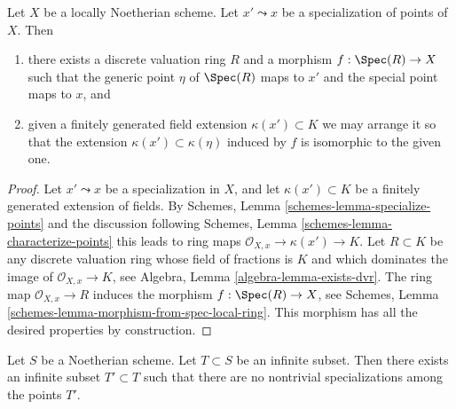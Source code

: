 \begin{lemma}
\label{lemma-locally-Noetherian-specialization-dvr}
Let $X$ be a locally Noetherian scheme.
Let $x' \leadsto x$ be a specialization of points of $X$.
Then
\begin{enumerate}
\item there exists a discrete valuation ring $R$ and a morphism
$f : \Spec(R) \to X$ such that the generic point $\eta$ of
$\Spec(R)$ maps to $x'$ and the special point maps to $x$, and
\item given a finitely generated field extension $\kappa(x') \subset K$
we may arrange it so that the extension $\kappa(x') \subset \kappa(\eta)$
induced by $f$ is isomorphic to the given one.
\end{enumerate}
\end{lemma}

\begin{proof}
Let $x' \leadsto x$ be a specialization in $X$, and let
$\kappa(x') \subset K$ be a finitely generated extension of fields. By
Schemes, Lemma \ref{schemes-lemma-specialize-points}
and the discussion following
Schemes, Lemma \ref{schemes-lemma-characterize-points}
this leads to ring maps $\mathcal{O}_{X, x} \to \kappa(x') \to K$.
Let $R \subset K$ be any discrete valuation ring whose field of fractions is
$K$ and which dominates the image of $\mathcal{O}_{X, x} \to K$, see
Algebra, Lemma \ref{algebra-lemma-exists-dvr}.
The ring map $\mathcal{O}_{X, x} \to R$ induces the morphism
$f : \Spec(R) \to X$, see
Schemes, Lemma \ref{schemes-lemma-morphism-from-spec-local-ring}.
This morphism has all the desired properties by construction.
\end{proof}

\begin{lemma}
\label{lemma-thin-infinite-sequence}
Let $S$ be a Noetherian scheme. Let $T \subset S$ be an infinite subset.
Then there exists an infinite subset $T' \subset T$
such that there are no nontrivial specializations among the points $T'$.
\end{lemma}


